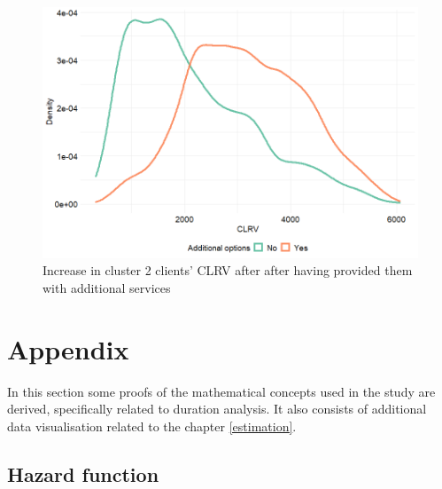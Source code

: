\documentclass[
]{book}
\begin{document}
\begin{figure}

{\centering \includegraphics[width=12.5in]{./imgs/clust2_clrv} 

}

\caption{Increase in cluster 2 clients' CLRV after after having provided them with additional services}\label{fig:clust2CLRV}
\end{figure}

\hypertarget{appendix}{%
\chapter*{Appendix}\label{appendix}}

In this section some proofs of the mathematical concepts used in the study are derived, specifically related to duration analysis. It also consists of additional data visualisation related to the chapter \ref{estimation}.

\hypertarget{hazard-function}{%
\section*{Hazard function}\label{hazard-function}}
\end{document}
